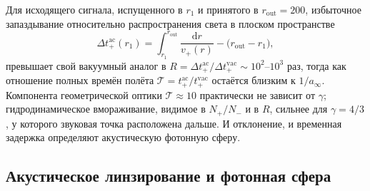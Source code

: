 \documentclass[12pt,a4paper,preprint]{elsarticle}
\begin{document}
            Для исходящего сигнала, испущенного в $r_{1}$ и принятого в $r_{\mathrm{out}}=200$, избыточное запаздывание относительно распространения света в плоском пространстве
            \begin{equation}
                \Delta t^{\mathrm{ac}}_{+}(r_{1}) = \int^{r_{\mathrm{out}}}_{r_{1}}\frac{\mathrm{d}r}{v_{+}(r)} - \bigl(r_{\mathrm{out}}-r_{1}\bigr) ,
                \label{eq:shapiro-excess}
            \end{equation}
            превышает свой вакуумный аналог в $R=\Delta t^{\mathrm{ac}}_{+}/\Delta t^{\mathrm{vac}}_{+}\sim 10^{2}$--$10^{3}$ раз, тогда как отношение полных времён полёта $\mathcal{T}=t^{\mathrm{ac}}_{+}/t^{\mathrm{vac}}_{+}$ остаётся близким к $1/a_{\infty}$. Компонента геометрической оптики $\mathcal{T}\approx 10$ практически не зависит от $\gamma$; гидродинамическое вмораживание, видимое в $N_{+}/N_{-}$ и в $R$, сильнее для $\gamma=4/3$, у которого звуковая точка расположена дальше. И отклонение, и временная задержка определяют акустическую фотонную сферу.

        \subsection{Акустическое линзирование и фотонная сфера}\label{subsec:photon-sphere}
\end{document}
